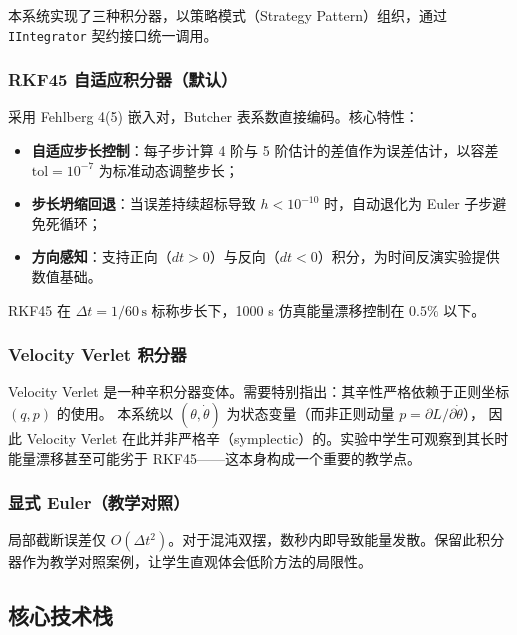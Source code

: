 本系统实现了三种积分器，以策略模式（Strategy Pattern）组织，通过 \texttt{IIntegrator} 契约接口统一调用。

\subsubsection{RKF45 自适应积分器（默认）}

采用 Fehlberg 4(5) 嵌入对，Butcher 表系数直接编码。核心特性：

\begin{itemize}
  \item \textbf{自适应步长控制}：每子步计算 4 阶与 5 阶估计的差值作为误差估计，以容差 $\text{tol} = 10^{-7}$ 为标准动态调整步长；
  \item \textbf{步长坍缩回退}：当误差持续超标导致 $h < 10^{-10}$ 时，自动退化为 Euler 子步避免死循环；
  \item \textbf{方向感知}：支持正向（$dt > 0$）与反向（$dt < 0$）积分，为时间反演实验提供数值基础。
\end{itemize}

RKF45 在 $\Delta t = 1/60\,\mathrm{s}$ 标称步长下，1000 s 仿真能量漂移控制在 $0.5\%$ 以下。

\subsubsection{Velocity Verlet 积分器}

Velocity Verlet 是一种辛积分器变体。需要特别指出：其辛性严格依赖于正则坐标 $(q, p)$ 的使用。
本系统以 $(\theta, \dot{\theta})$ 为状态变量（而非正则动量 $p = \partial L/\partial \dot{\theta}$），
因此 Velocity Verlet 在此并非严格辛（symplectic）的。实验中学生可观察到其长时能量漂移甚至可能劣于 RKF45——这本身构成一个重要的教学点。

\subsubsection{显式 Euler（教学对照）}

局部截断误差仅 $O(\Delta t^2)$。对于混沌双摆，数秒内即导致能量发散。保留此积分器作为教学对照案例，让学生直观体会低阶方法的局限性。

\subsection{核心技术栈}

